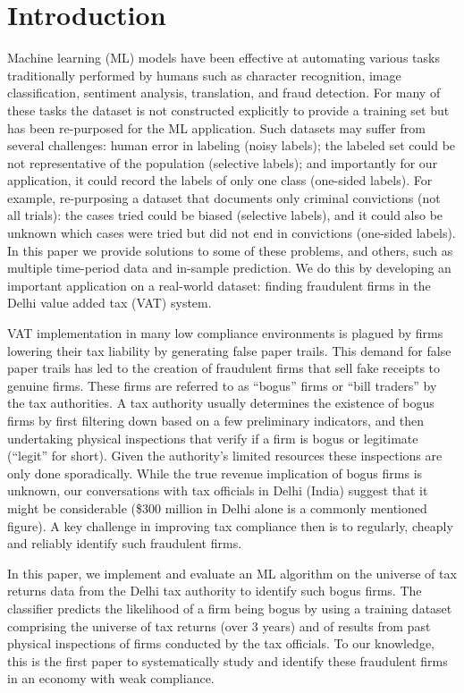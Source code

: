 \section{Introduction}
Machine learning (ML) models have been effective at automating various tasks traditionally performed by humans such as character recognition, image classification, sentiment analysis, translation, and fraud detection. For many of these tasks the dataset is not constructed explicitly to provide a training set but has been re-purposed for the ML application. Such datasets may suffer from several challenges: human error in labeling (noisy labels); the labeled set could be not representative of the population (selective labels); and importantly for our application, it could record the labels of only one class (one-sided labels). For example, re-purposing a dataset that documents only criminal convictions (not all trials): the cases tried could be biased (selective labels), and it could also be unknown which cases were tried but did not end in convictions (one-sided labels). In this paper we provide solutions to some of these problems, and others, such as multiple time-period data and in-sample prediction. We do this by developing an important application on a real-world dataset: finding fraudulent firms in the Delhi value added tax (VAT) system.

VAT implementation in many low compliance environments is plagued by firms lowering their tax liability by generating false paper trails. This demand for false paper trails has led to the creation of fraudulent firms that sell fake receipts to genuine firms. These firms are referred to as ``bogus'' firms or ``bill traders'' by the tax authorities. A tax authority usually determines the existence of bogus firms by first filtering down based on a few preliminary indicators, and then undertaking physical inspections that verify if a firm is bogus or legitimate (``legit'' for short). Given the authority's limited resources these inspections are only done sporadically.  While the true revenue implication of bogus firms is unknown, our conversations with tax officials in Delhi (India) suggest that it might be considerable (\$300 million in Delhi alone is a commonly mentioned figure). A key challenge in improving tax compliance then is to regularly, cheaply and reliably identify such fraudulent firms. 

In this paper, we implement and evaluate an ML algorithm on the universe of tax returns data from the Delhi tax authority to identify such bogus firms. The classifier predicts the likelihood of a firm being bogus by using a training dataset comprising the universe of tax returns (over 3 years) and of results from past physical inspections of firms conducted by the tax officials. To our knowledge, this is the first paper to systematically study and identify these fraudulent firms in an economy with weak compliance.


